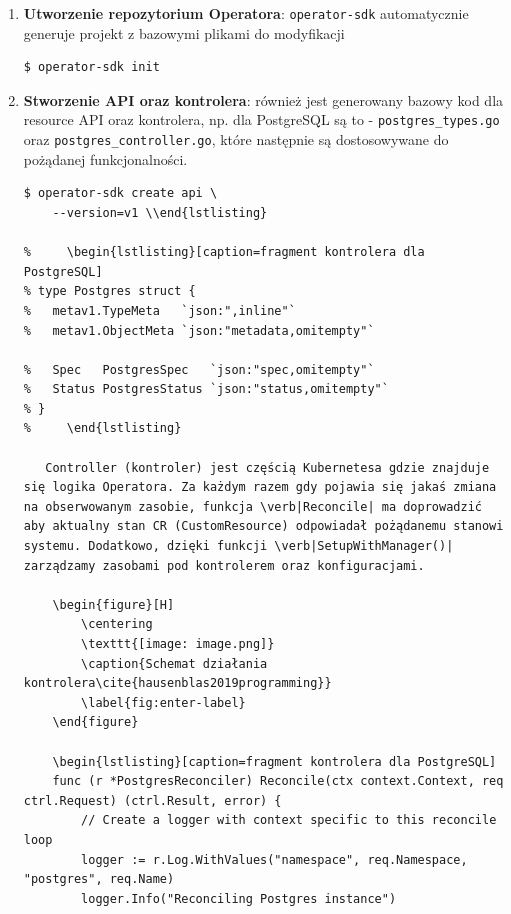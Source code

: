 \documentclass[polish]{aghengthesis}
\begin{document}
\begin{enumerate}
    \item \textbf{Utworzenie repozytorium Operatora}: \verb|operator-sdk| automatycznie generuje projekt z bazowymi plikami do modyfikacji
    \begin{lstlisting}[basicstyle=\ttfamily, numbers=none]
 $ operator-sdk init\end{lstlisting}
\vspace{-20pt}
   \item \textbf{Stworzenie API oraz kontrolera}:
   również jest generowany bazowy kod dla resource API oraz kontrolera, np. dla PostgreSQL są to - \verb|postgres_types.go| oraz \verb|postgres_controller.go|, które następnie są dostosowywane do pożądanej funkcjonalności.
   \begin{lstlisting}[basicstyle=\ttfamily, numbers=none]
$ operator-sdk create api \
    --version=v1 \\end{lstlisting}


    
   Controller (kontroler) jest częścią Kubernetesa gdzie znajduje się logika Operatora. Za każdym razem gdy pojawia się jakaś zmiana na obserwowanym zasobie, funkcja \verb|Reconcile| ma doprowadzić aby aktualny stan CR (CustomResource) odpowiadał pożądanemu stanowi systemu. Dodatkowo, dzięki funkcji \verb|SetupWithManager()| zarządzamy zasobami pod kontrolerem oraz konfiguracjami.

    \begin{figure}[H]
        \centering
        \texttt{[image: image.png]}
        \caption{Schemat działania kontrolera\cite{hausenblas2019programming}}
        \label{fig:enter-label}
    \end{figure}
   
    \begin{lstlisting}[caption=fragment kontrolera dla PostgreSQL]
    func (r *PostgresReconciler) Reconcile(ctx context.Context, req ctrl.Request) (ctrl.Result, error) {
    	// Create a logger with context specific to this reconcile loop
    	logger := r.Log.WithValues("namespace", req.Namespace, "postgres", req.Name)
    	logger.Info("Reconciling Postgres instance")
    

\end{lstlisting}
\end{enumerate}
\end{document}
